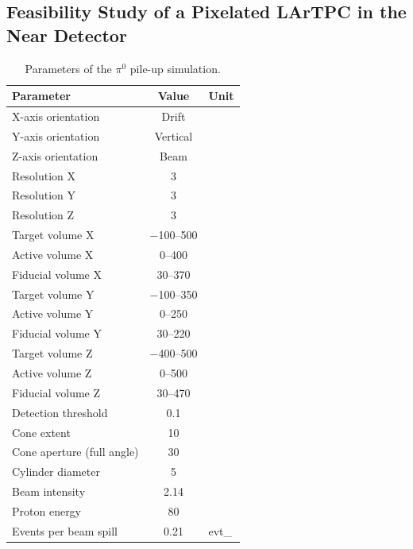 \documentclass[a4paper]{article}
\begin{document}
\subsection{Feasibility Study of a Pixelated LArTPC in the Near Detector}

\begin{table}[tbp]
	\centering
	\caption{Parameters of the $\pi^0$ pile-up simulation.}
	\label{tab:dune-nd_pile-up-params}
	\begin{tabu} to \textwidth {lSs}
		\toprule
		Parameter &						{Value} &				{Unit} \\
		\midrule
		X-axis orientation &			{Drift} &				\\
		Y-axis orientation &			{Vertical} &			\\
		Z-axis orientation &			{Beam} &				\\
		Resolution X &					3 &						\milli\metre \\
		Resolution Y &					3 &						\milli\metre \\
		Resolution Z &					3 &						\milli\metre \\
		Target volume X &				\numrange{-100}{500} &	\centi\metre \\
		Active volume X &				\numrange{0}{400} &		\centi\metre \\
		Fiducial volume X &				\numrange{30}{370} &	\centi\metre \\
		Target volume Y &				\numrange{-100}{350} &	\centi\metre \\
		Active volume Y &				\numrange{0}{250} &		\centi\metre \\
		Fiducial volume Y &				\numrange{30}{220} &	\centi\metre \\
		Target volume Z &				\numrange{-400}{500} &	\centi\metre \\
		Active volume Z &				\numrange{0}{500} &		\centi\metre \\
		Fiducial volume Z &				\numrange{30}{470} &	\centi\metre \\
		Detection threshold &			0.1 &					\mega\electronvolt \\
		Cone extent &					10 &				 	\radlen \\
		Cone aperture (full angle) &	30 &					\degree \\
		Cylinder diameter &				5 &						\centi\metre \\
		Beam intensity &				2.14 &					\mega\watt \\
		Proton energy &					80 &					\giga\electronvolt \\
		Events per beam spill &			0.21 &					evt\per\tonne_{}\\
		\bottomrule
	\end{tabu}
\end{table}
\end{document}
